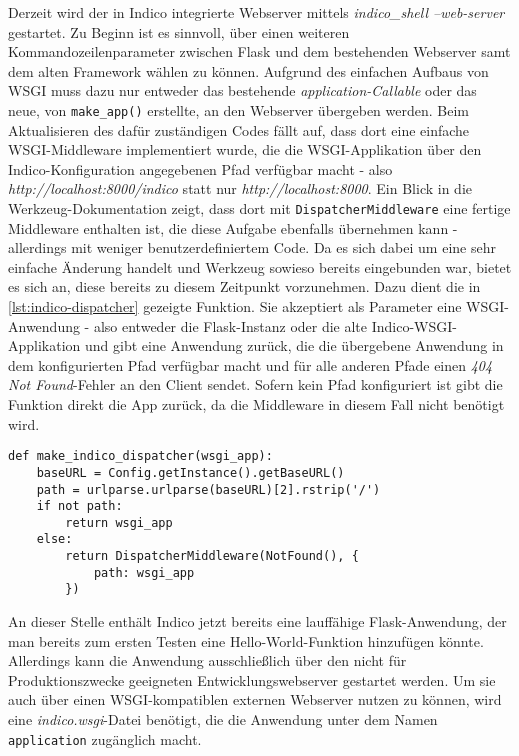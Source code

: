 Derzeit wird der in Indico integrierte Webserver mittels \emph{indico\_shell --web-server}
gestartet. Zu Beginn ist es sinnvoll, über einen weiteren Kommandozeilenparameter zwischen Flask und
dem bestehenden Webserver samt dem alten Framework wählen zu können. Aufgrund des einfachen Aufbaus
von WSGI muss dazu nur entweder das bestehende \emph{application-Callable} oder das neue, von
\lstinline{make_app()} erstellte, an den Webserver übergeben werden. Beim Aktualisieren des
dafür zuständigen Codes fällt auf, dass dort eine einfache WSGI-Middleware implementiert wurde, die
die WSGI-Applikation über den Indico-Konfiguration angegebenen Pfad verfügbar macht - also
\emph{http://localhost:8000/indico} statt nur \emph{http://localhost:8000}. Ein Blick
in die Werkzeug-Dokumentation zeigt, dass dort mit \lstinline{DispatcherMiddleware} eine fertige
Middleware enthalten ist, die diese Aufgabe ebenfalls übernehmen kann - allerdings mit weniger
benutzerdefiniertem Code. Da es sich dabei um eine sehr einfache Änderung handelt und Werkzeug
sowieso bereits eingebunden war, bietet es sich an, diese bereits zu diesem Zeitpunkt vorzunehmen.
Dazu dient die in \autoref{lst:indico-dispatcher} gezeigte Funktion. Sie akzeptiert als Parameter
eine WSGI-Anwendung - also entweder die Flask-Instanz oder die alte Indico-WSGI-Applikation und gibt
eine Anwendung zurück, die die übergebene Anwendung in dem konfigurierten Pfad verfügbar macht und
für alle anderen Pfade einen \emph{404 Not Found}-Fehler an den Client sendet. Sofern kein Pfad
konfiguriert ist gibt die Funktion direkt die App zurück, da die Middleware in diesem Fall nicht
benötigt wird.

\begin{lstlisting}[caption=Indico-WSGI-Dispatcher,label=lst:indico-dispatcher]
def make_indico_dispatcher(wsgi_app):
    baseURL = Config.getInstance().getBaseURL()
    path = urlparse.urlparse(baseURL)[2].rstrip('/')
    if not path:
        return wsgi_app
    else:
        return DispatcherMiddleware(NotFound(), {
            path: wsgi_app
        })
\end{lstlisting}

An dieser Stelle enthält Indico jetzt bereits eine lauffähige Flask-Anwendung, der man bereits zum
ersten Testen eine Hello-World-Funktion hinzufügen könnte. Allerdings kann die Anwendung
ausschließlich über den nicht für Produktionszwecke geeigneten Entwicklungswebserver gestartet
werden. Um sie auch über einen WSGI-kompatiblen externen Webserver nutzen zu können, wird eine
\emph{indico.wsgi}-Datei benötigt, die die Anwendung unter dem Namen \lstinline{application}
zugänglich macht.

